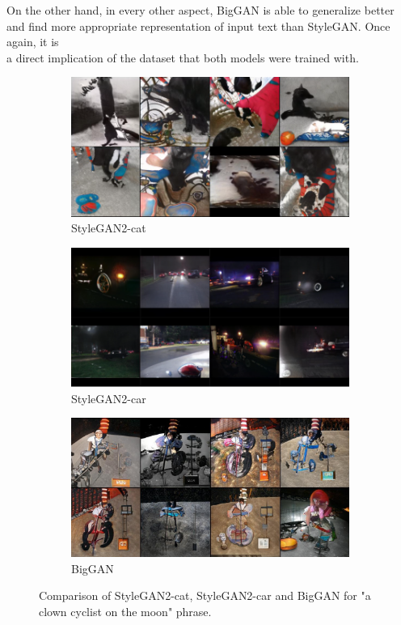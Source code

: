 \documentclass[12pt,a4paper,openany]{book}
\begin{document}
\noindent On the other hand, in every other aspect, BigGAN is able to generalize better and find more appropriate representation of input text than StyleGAN. Once again, it is \\a direct implication of the dataset that both models were trained with. 

\begin{figure}[H]
\centering
\begin{subfigure}[b]{1.0\textwidth}
\centering
   \includegraphics[width=0.7\linewidth]{clown_stylegancat2.PNG}
   \caption{StyleGAN2-cat}
   \label{fig:Ng1} 
\end{subfigure}

\begin{subfigure}[b]{1.0\textwidth}
\centering
   \includegraphics[width=0.7\linewidth]{clown_stylegancar.PNG}
   \caption{StyleGAN2-car}
   \label{fig:Ng2}
\end{subfigure}

\begin{subfigure}[b]{1.0\textwidth}
\centering
   \includegraphics[width=0.7\linewidth]{clown_biggan.PNG}
   \caption{BigGAN}
   \label{fig:Ng2}
\end{subfigure}

\caption[pics]{Comparison of StyleGAN2-cat, StyleGAN2-car and BigGAN for "a clown cyclist on the moon" phrase.}
\end{figure}
\end{document}
